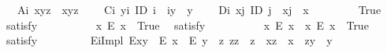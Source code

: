 \begin{isabellebody}
\ \ \ A\isactrlsub i{\isacharcolon}\ {\isachardoublequoteopen}x{\isasymcdot}{\isacharparenleft}y{\isasymcdot}z{\isacharparenright}\ {\isasymcong}\ {\isacharparenleft}x{\isasymcdot}y{\isacharparenright}{\isasymcdot}z{\isachardoublequoteclose}\ \isanewline
\ \ \ C\isactrlsub i{\isacharcolon}\ {\isachardoublequoteopen}\isactrlbold {\isasymforall}y{\isachardot}\isactrlbold {\isasymexists}i{\isachardot}\ ID\ i\ \isactrlbold {\isasymand}\ i{\isasymcdot}y\ {\isasymcong}\ y{\isachardoublequoteclose}\ \isanewline
\ \ \ D\isactrlsub i{\isacharcolon}\ {\isachardoublequoteopen}\isactrlbold {\isasymforall}x{\isachardot}\isactrlbold {\isasymexists}j{\isachardot}\ ID\ j\ \isactrlbold {\isasymand}\ x{\isasymcdot}j\ {\isasymcong}\ x{\isachardoublequoteclose}\ \isanewline
\ \ \isanewline
\ \ \ \isamarkupfalse%
\ True\ \isamarkupfalse%
\ {\isacharbrackleft}satisfy{\isacharbrackright}%
\isadelimproof
\ %
\endisadelimproof
%
\isatagproof
{}\isamarkupfalse%
\ \ %
%
\endisatagproof
{\isafoldproof}%
%
\isadelimproof
%
\endisadelimproof
\isanewline
\ \ \ \isamarkupfalse%
\ \ {\isachardoublequoteopen}{\isasymexists}x{\isachardot}\ \isactrlbold {\isasymnot}{\isacharparenleft}E\ x{\isacharparenright}{\isachardoublequoteclose}\ \ True\ \isamarkupfalse%
\ {\isacharbrackleft}satisfy{\isacharbrackright}%
\isadelimproof
\ %
\endisadelimproof
%
\isatagproof
{}\isamarkupfalse%
\ \ %
%
\endisatagproof
{\isafoldproof}%
%
\isadelimproof
%
\endisadelimproof
\isanewline
\ \ \ \isamarkupfalse%
\ \ {\isachardoublequoteopen}{\isacharparenleft}{\isasymexists}x{\isachardot}\ \isactrlbold {\isasymnot}{\isacharparenleft}E\ x{\isacharparenright}{\isacharparenright}\ {\isasymand}\ {\isacharparenleft}{\isasymexists}x{\isachardot}\ {\isacharparenleft}E\ x{\isacharparenright}{\isacharparenright}{\isachardoublequoteclose}\ \ True\ \isamarkupfalse%
\ {\isacharbrackleft}satisfy{\isacharbrackright}%
\isadelimproof
\ %
\endisadelimproof
%
\isatagproof
{}\isamarkupfalse%
\ \ %
%
\endisatagproof
{\isafoldproof}%
%
\isadelimproof
%
\endisadelimproof
\isanewline
\isanewline
\ \ \ \isamarkupfalse%
\ E\isactrlsub iImpl{\isacharcolon}\ {\isachardoublequoteopen}E{\isacharparenleft}x{\isasymcdot}y{\isacharparenright}\ \isactrlbold {\isasymrightarrow}\ {\isacharparenleft}E\ x\ \isactrlbold {\isasymand}\ E\ y\ \isactrlbold {\isasymand}\ {\isacharparenleft}\isactrlbold {\isasymexists}z{\isachardot}\ z{\isasymcdot}z\ {\isasymcong}\ z\ \isactrlbold {\isasymand}\ x{\isasymcdot}z\ {\isasymcong}\ x\ \isactrlbold {\isasymand}\ z{\isasymcdot}y\ {\isasymcong}\ y{\isacharparenright}{\isacharparenright}{\isachardoublequoteclose}%

\end{isabellebody}
